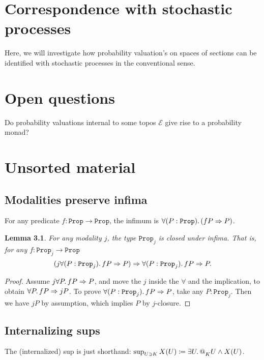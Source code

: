 \documentclass[11pt, oneside, article]{memoir}
\makeatletter
\theoremstyle{plain}
\newtheorem{lemma}[theorem]{Lemma}
\theoremstyle{definition}
\theoremstyle{remark}
\newcommand{\const}[1]{\mathtt{#1}}
\newcommand{\cat}[1]{\mathcal{#1}}
\newcommand{\Prop}{\const{Prop}}
\newcommand{\AtSymbol}{{@}}
\newcommand{\At}[2][]{\AtSymbol^{#1}_{#2}}
\newcommand{\imp}{\Rightarrow}
\makeatother
\begin{document}
\chapter{Correspondence with stochastic processes}

Here, we will investigate how probability valuation's on spaces of sections can be identified with stochastic processes in the conventional sense.

\chapter{Open questions}

Do probability valuations internal to some topos $\cat{E}$ give rise to a probability monad?



\newpage

\appendix


\appendix

\chapter{Unsorted material}

\section{Modalities preserve infima}

For any predicate $f:\Prop\to\Prop$, the infimum is $\forall(P:\Prop)\ldotp(fP\imp P)$.

\begin{lemma}
For any modality $j$, the type $\Prop_j$ is closed under infima. That is, for any $f:\Prop_j\to\Prop$
\[(j\forall(P:\Prop_j)\ldotp fP\imp P)\imp\forall(P:\Prop_j)\ldotp fP\imp P.\]
\end{lemma}
\begin{proof}
Assume $j\forall P\ldotp fP\imp P$, and move the $j$ inside the $\forall$ and the implication, to obtain $\forall P\ldotp fP\imp jP$. To prove $\forall(P:\Prop_j)\ldotp fP\imp P$, take any $P:\Prop_j$. Then we have $jP$ by assumption, which implies $P$ by $j$-closure.
\end{proof}

\section{Internalizing sups}
 
The (internalized) sup is just shorthand: $\sup_{U\ni K}X(U)\coloneqq \exists U\ldotp \At{K}U\wedge X(U)$.
\end{document}
